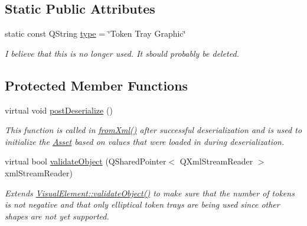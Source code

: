 \subsection*{Static Public Attributes}
\begin{DoxyCompactItemize}
\item 
\hypertarget{class_picto_1_1_token_tray_graphic_aecf8a593a6ae5c1e721e5146931c3913}{static const Q\-String \hyperlink{class_picto_1_1_token_tray_graphic_aecf8a593a6ae5c1e721e5146931c3913}{type} = \char`\"{}Token Tray Graphic\char`\"{}}\label{class_picto_1_1_token_tray_graphic_aecf8a593a6ae5c1e721e5146931c3913}

\begin{DoxyCompactList}\small\item\em I believe that this is no longer used. It sbould probably be deleted. \end{DoxyCompactList}\end{DoxyCompactItemize}
\subsection*{Protected Member Functions}
\begin{DoxyCompactItemize}
\item 
virtual void \hyperlink{class_picto_1_1_token_tray_graphic_a8435a6569e216cff2d1ca7e5c113b6e4}{post\-Deserialize} ()
\begin{DoxyCompactList}\small\item\em This function is called in \hyperlink{class_picto_1_1_asset_a8bed4da09ecb1c07ce0dab313a9aba67}{from\-Xml()} after successful deserialization and is used to initialize the \hyperlink{class_picto_1_1_asset}{Asset} based on values that were loaded in during deserialization. \end{DoxyCompactList}\item 
\hypertarget{class_picto_1_1_token_tray_graphic_a7e7d1ad93fb52220630fc18804c3a5d6}{virtual bool \hyperlink{class_picto_1_1_token_tray_graphic_a7e7d1ad93fb52220630fc18804c3a5d6}{validate\-Object} (Q\-Shared\-Pointer$<$ Q\-Xml\-Stream\-Reader $>$ xml\-Stream\-Reader)}\label{class_picto_1_1_token_tray_graphic_a7e7d1ad93fb52220630fc18804c3a5d6}

\begin{DoxyCompactList}\small\item\em Extends \hyperlink{struct_picto_1_1_visual_element_a681b115b3f3ea6d24ab803cab9d6ee5b}{Visual\-Element\-::validate\-Object()} to make sure that the number of tokens is not negative and that only elliptical token trays are being used since other shapes are not yet supported. \end{DoxyCompactList}\end{DoxyCompactItemize}
